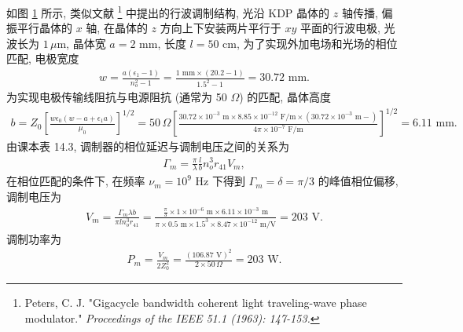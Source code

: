 \documentclass{note}
\begin{document}
\begin{sol}
    如图 \ref{14.5-fig} 所示, 类似文献 \footnote{Peters, C. J. "Gigacycle bandwidth coherent light traveling-wave phase modulator." \itshape{Proceedings of the IEEE} 51.1 (1963): 147-153.} 中提出的行波调制结构, 光沿 KDP 晶体的 $z$ 轴传播, 偏振平行晶体的 $x$ 轴, 在晶体的 $z$ 方向上下安装两片平行于 $xy$ 平面的行波电极, 光波长为 $1\,\mu$m, 晶体宽 $a=2$ mm, 长度 $l=50$ cm, 为了实现外加电场和光场的相位匹配, 电极宽度
    \begin{align}
        w=\frac{a(\epsilon_1-1)}{n_o^2-1}=\frac{1\text{ mm}\times(20.2-1)}{1.5^2-1}=30.72\text{ mm}.
    \end{align}
    为实现电极传输线阻抗与电源阻抗 (通常为 50 $\Omega$) 的匹配, 晶体高度
    \begin{align}
        b=Z_0\left[\frac{w\epsilon_0(w-a+\epsilon_1a)}{\mu_0}\right]^{1/2}=50\,\Omega\left[\frac{30.72\times 10^{-3}\text{ m}\times8.85\times 10^{-12}\text{ F/m}\times(30.72\times 10^{-3}\text{ m}-)}{4\pi\times 10^{-7}\text{ F/m}}\right]^{1/2}=6.11\text{ mm}.
    \end{align}
    由课本表 14.3, 调制器的相位延迟与调制电压之间的关系为
    \begin{align}
        \Gamma_m=\frac{\pi}{\lambda}\frac{l}{b}n_o^3r_{41}V_m,
    \end{align}
    在相位匹配的条件下, 在频率 $\nu_m=10^9$ Hz 下得到 $\Gamma_m=\delta=\pi/3$ 的峰值相位偏移, 调制电压为
    \begin{align}
        V_m=\frac{\Gamma_m\lambda b}{\pi ln_o^3r_{41}}=\frac{\frac{\pi}{3}\times 1\times 10^{-6}\text{ m}\times 6.11\times 10^{-3}\text{ m}}{\pi\times 0.5\text{ m}\times1.5^3\times 8.47\times 10^{-12}\text{ m/V}}=203\text{ V}.
    \end{align}
    调制功率为
    \begin{align}
        P_m=\frac{V_m}{2Z_0^2}=\frac{(106.87\text{ V})^2}{2\times 50\,\Omega}=203\text{ W}.
    \end{align}
    \begin{figure}[H]
        \centering
        \caption{}
        \label{14.5-fig}
    \end{figure}
\end{sol}
\end{document}
